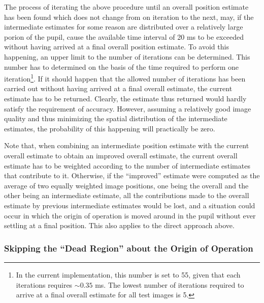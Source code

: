 The process of iterating the above procedure until an overall position
estimate has been found which does not change from on iteration to the
next, may, if the intermediate estimates for some reason are
distributed over a relatively large porion of the pupil, cause the
available time interval of 20 ms to be exceeded without having arrived
at a final overall position estimate.  To avoid this happening, an
upper limit to the number of iterations can be determined.  This
number has to determined on the basis of the time required to perform
one iteration\footnote{\label{pg:iterationtime}In the current
  implementation, this number is set to 55, given that each iterations
  requires $\sim 0.35$ ms.  The lowest number of iterations required
  to arrive at a final overall estimate for all test images is 5.}.
If it should happen that the allowed number of iterations has been
carried out without having arrived at a final overall estimate, the
current estimate has to be returned.  Clearly, the estimate thus
returned would hardly satisfy the requirement of accuracy.  However,
assuming a relatively good image quality and thus minimizing the
spatial distribution of the intermediate estimates, the probability of
this happening will practically be zero.

Note that, when combining an intermediate position estimate with the
current overall estimate to obtain an improved overall estimate, the
current overall estimate has to be weighted according to the number of
intermediate estimates that contribute to it.  Otherwise, if the
``improved'' estimate were computed as the average of two equally
weighted image positions, one being the overall and the other being an
intermediate estimate, all the contributions made to the overall
estimate by previous intermediate estimates would be lost, and a
situation could occur in which the origin of operation is moved around
in the pupil without ever settling at a final position.  This also
applies to the direct approach above.

\subsubsection{Skipping the ``Dead Region'' about the Origin of
  Operation}

